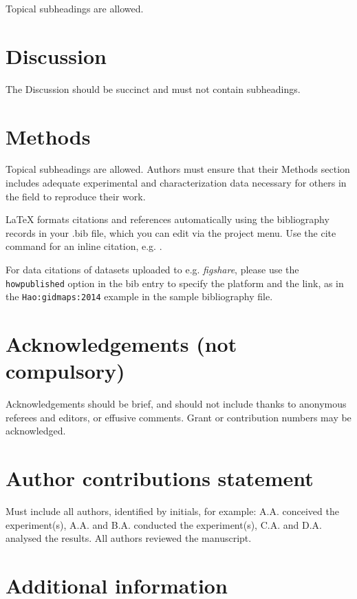 \documentclass[fleqn,10pt]{wlscirep}
\begin{document}
Topical subheadings are allowed.

\section*{Discussion}

The Discussion should be succinct and must not contain subheadings.

\section*{Methods}

Topical subheadings are allowed. Authors must ensure that their Methods section includes adequate experimental and characterization data necessary for others in the field to reproduce their work.



\noindent LaTeX formats citations and references automatically using the bibliography records in your .bib file, which you can edit via the project menu. Use the cite command for an inline citation, e.g.  \cite{Hao:gidmaps:2014}.

For data citations of datasets uploaded to e.g. \emph{figshare}, please use the \verb|howpublished| option in the bib entry to specify the platform and the link, as in the \verb|Hao:gidmaps:2014| example in the sample bibliography file.

\section*{Acknowledgements (not compulsory)}

Acknowledgements should be brief, and should not include thanks to anonymous referees and editors, or effusive comments. Grant or contribution numbers may be acknowledged.

\section*{Author contributions statement}

Must include all authors, identified by initials, for example:
A.A. conceived the experiment(s),  A.A. and B.A. conducted the experiment(s), C.A. and D.A. analysed the results.  All authors reviewed the manuscript. 

\section*{Additional information}
\end{document}
